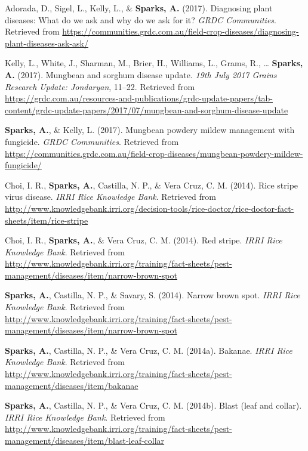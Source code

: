 \documentclass[11pt, a4paper]{awesome-cv}
\begin{document}
\leavevmode\hypertarget{ref-Adorada2017}{}%
Adorada, D., Sigel, L., Kelly, L., \& \textbf{Sparks, A.} (2017).
Diagnosing plant diseases: {What} do we ask and why do we ask for it?
\emph{GRDC Communities}. Retrieved from
\url{https://communities.grdc.com.au/field-crop-diseases/diagnosing-plant-diseases-ask-ask/}

\leavevmode\hypertarget{ref-Kelly2017}{}%
Kelly, L., White, J., Sharman, M., Brier, H., Williams, L., Grams, R.,
\ldots{} \textbf{Sparks, A.} (2017). Mungbean and sorghum disease
update. \emph{19th July 2017 Grains Research Update: Jondaryan}, 11--22.
Retrieved from
\url{https://grdc.com.au/resources-and-publications/grdc-update-papers/tab-content/grdc-update-papers/2017/07/mungbean-and-sorghum-disease-update}

\leavevmode\hypertarget{ref-Sparks2017}{}%
\textbf{Sparks, A.}, \& Kelly, L. (2017). Mungbean powdery mildew
management with fungicide. \emph{GRDC Communities}. Retrieved from
\url{https://communities.grdc.com.au/field-crop-diseases/mungbean-powdery-mildew-fungicide/}

\leavevmode\hypertarget{ref-Choi2014b}{}%
Choi, I. R., \textbf{Sparks, A.}, Castilla, N. P., \& Vera Cruz, C. M.
(2014). Rice stripe virus disease. \emph{{IRRI} Rice Knowledge Bank}.
Retrieved from
\url{http://www.knowledgebank.irri.org/decision-tools/rice-doctor/rice-doctor-fact-sheets/item/rice-stripe}

\leavevmode\hypertarget{ref-Choi2014}{}%
Choi, I. R., \textbf{Sparks, A.}, \& Vera Cruz, C. M. (2014). Red
stripe. \emph{{IRRI} Rice Knowledge Bank}. Retrieved from
\url{http://www.knowledgebank.irri.org/training/fact-sheets/pest-management/diseases/item/narrow-brown-spot}

\leavevmode\hypertarget{ref-Sparks2014f}{}%
\textbf{Sparks, A.}, Castilla, N. P., \& Savary, S. (2014). Narrow brown
spot. \emph{{IRRI} Rice Knowledge Bank}. Retrieved from
\url{http://www.knowledgebank.irri.org/training/fact-sheets/pest-management/diseases/item/narrow-brown-spot}

\leavevmode\hypertarget{ref-Sparks2014}{}%
\textbf{Sparks, A.}, Castilla, N. P., \& Vera Cruz, C. M. (2014a).
Bakanae. \emph{{IRRI} Rice Knowledge Bank}. Retrieved from
\url{http://www.knowledgebank.irri.org/training/fact-sheets/pest-management/diseases/item/bakanae}

\leavevmode\hypertarget{ref-Sparks2014b}{}%
\textbf{Sparks, A.}, Castilla, N. P., \& Vera Cruz, C. M. (2014b). Blast
(leaf and collar). \emph{{IRRI} Rice Knowledge Bank}. Retrieved from
\url{http://www.knowledgebank.irri.org/training/fact-sheets/pest-management/diseases/item/blast-leaf-collar}
\end{document}

